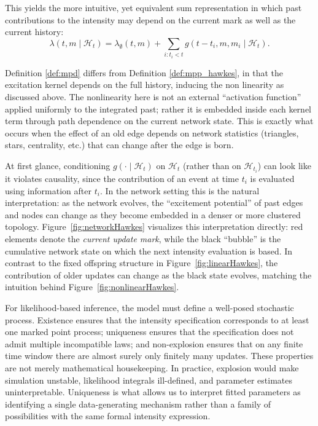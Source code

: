 \documentclass[12pt]{article}
\begin{document}
This yields the more intuitive, yet equivalent sum representation in which past contributions to the intensity may depend on the current mark as well as the current history:
\begin{equation}\label{eq:condintenHN}
    \lambda(t,m\mid\mathcal H_t)=\lambda_{\emptyset}(t,m)+\sum_{i:t_i<t}g(t-t_i,m,m_i\mid\mathcal H_t).
\end{equation}

Definition \ref{def:mpd} differs from Definition \ref{def:mpp_hawkes}, in that the excitation kernel depends on the full history, inducing the non linearity as discussed above. The nonlinearity here is not an external ``activation function'' applied uniformly to the integrated past; rather it is embedded inside each kernel term through path dependence on the current network state. This is exactly what occurs when the effect of an old edge depends on network statistics (triangles, stars, centrality, etc.) that can change after the edge is born.

At first glance, conditioning $g(\cdot\mid\mathcal H_t)$ on $\mathcal H_t$ (rather than on $\mathcal H_{t_i}$) can look like it violates causality, since the contribution of an event at time $t_i$ is evaluated using information after $t_i$. In the network setting this is the natural interpretation: as the network evolves, the ``excitement potential'' of past edges and nodes can change as they become embedded in a denser or more clustered topology. Figure~\ref{fig:networkHawkes} visualizes this interpretation directly: red elements denote the \emph{current update mark}, while the black ``bubble'' is the cumulative network state on which the next intensity evaluation is based. In contrast to the fixed offspring structure in Figure~\ref{fig:linearHawkes}, the contribution of older updates can change as the black state evolves, matching the intuition behind Figure~\ref{fig:nonlinearHawkes}.

For likelihood-based inference, the model must define a well-posed stochastic process. Existence ensures that the intensity specification corresponds to at least one marked point process; uniqueness ensures that the specification does not admit multiple incompatible laws; and non-explosion ensures that on any finite time window there are almost surely only finitely many updates. These properties are not merely mathematical housekeeping. In practice, explosion would make simulation unstable, likelihood integrals ill-defined, and parameter estimates uninterpretable. Uniqueness is what allows us to interpret fitted parameters as identifying a single data-generating mechanism rather than a family of possibilities with the same formal intensity expression.
\end{document}
